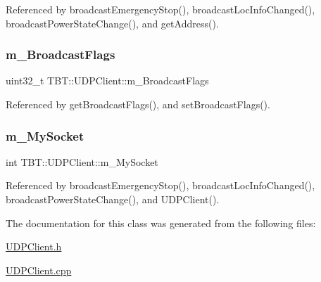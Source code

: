 Referenced by broadcast\+Emergency\+Stop(), broadcast\+Loc\+Info\+Changed(), broadcast\+Power\+State\+Change(), and get\+Address().

\mbox{\label{classTBT_1_1UDPClient_a91eb8f34a9606428eba7230c2bfdb6f6_a91eb8f34a9606428eba7230c2bfdb6f6}} 
\subsubsection{\texorpdfstring{m\+\_\+\+Broadcast\+Flags}{m\_BroadcastFlags}}
{\footnotesize\ttfamily uint32\+\_\+t T\+B\+T\+::\+U\+D\+P\+Client\+::m\+\_\+\+Broadcast\+Flags\hspace{0.3cm}{\ttfamily [protected]}}



Referenced by get\+Broadcast\+Flags(), and set\+Broadcast\+Flags().

\mbox{\label{classTBT_1_1UDPClient_aef66ad83fa20b995152c6f41cb8ba91f_aef66ad83fa20b995152c6f41cb8ba91f}} 
\subsubsection{\texorpdfstring{m\+\_\+\+My\+Socket}{m\_MySocket}}
{\footnotesize\ttfamily int T\+B\+T\+::\+U\+D\+P\+Client\+::m\+\_\+\+My\+Socket\hspace{0.3cm}{\ttfamily [protected]}}



Referenced by broadcast\+Emergency\+Stop(), broadcast\+Loc\+Info\+Changed(), broadcast\+Power\+State\+Change(), and U\+D\+P\+Client().



The documentation for this class was generated from the following files\+:\begin{DoxyCompactItemize}
\item 
\hyperlink{UDPClient_8h}{U\+D\+P\+Client.\+h}\item 
\hyperlink{UDPClient_8cpp}{U\+D\+P\+Client.\+cpp}\end{DoxyCompactItemize}

